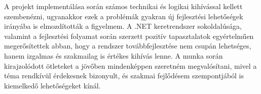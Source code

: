 A projekt implementálása során számos technikai és logikai kihívással kellett szembenézni, ugyanakkor ezek a problémák gyakran új fejlesztési lehetőségek irányába is elmozdították a figyelmem. A .NET keretrendszer sokoldalúsága, valamint a fejlesztési folyamat során szerzett pozitív tapasztalatok egyértelműen megerősítettek abban, hogy a rendszer továbbfejlesztése nem csupán lehetséges, hanem izgalmas és szakmailag is értékes kihívás lenne. A munka során kirajzolódott ötleteket a jövőben mindenképpen szeretném megvalósítani, mivel a téma rendkívül érdekesnek bizonyult, és szakmai fejlődésem szempontjából is kiemelkedő lehetőségeket kínál.

